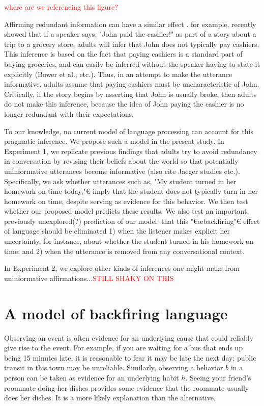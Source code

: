 \documentclass[10pt,letterpaper]{article}
\newcommand{\red}[1]{\textcolor{Red}{#1}}
\begin{document}
\red{where are we referencing this figure?}

Affirming redundant information can have a similar effect \cite{Gruenfeld1992, Kravtchenko2015}.  
 for example, recently showed that if a speaker says, "John paid the cashier!" as part of a story about a trip to a grocery store, adults will infer that John does not typically pay cashiers.  This inference is based on the fact that paying cashiers is a standard part of buying groceries, and can easily be inferred without the speaker having to state it explicitly (Bower et al., etc.).  Thus, in an attempt to make the utterance informative, adults assume that paying cashiers must be uncharacteristic of John.  Critically, if the story begins by asserting that John is usually broke, then adults do not make this inference, because the idea of John paying the cashier is no longer redundant with their expectations.

To our knowledge, no current model of language processing can account for this pragmatic inference.  We propose such a model in the present study.  In Experiment 1, we replicate previous findings that adults try to avoid redundancy in conversation by revising their beliefs about the world so that potentially uninformative utterances become informative \cite{Kravtchenko2015} (also cite Jaeger studies etc.).  Specifically, we ask whether utterances such as, "My student turned in her homework on time today,"€ imply that the student does not typically turn in her homework on time, despite serving as evidence for this behavior.  We then test whether our proposed model predicts these results.  We also test an important, previously unexplored(?) prediction of our model: that this "€œbackfiring"€ effect of language should be eliminated 1) when the listener makes explicit her uncertainty, for instance, about whether the student turned in his homework on time; and 2) when the utterance is removed from any conversational context.


In Experiment 2, we explore other kinds of inferences one might make from uninformative affirmations...\red{STILL SHAKY ON THIS}



\section{A model of backfiring language}

Observing an event is often evidence for an underlying cause that could reliably give rise to the event.
For example, if you are waiting for a bus that ends up being 15 minutes late, it is reasonable to fear it may be late the next day; public transit in this town may be unreliable. 
Similarly, observing a behavior $b$ in a person can be taken as evidence for an underlying habit $h$. 
Seeing your friend's roommate doing her dishes provides some evidence that the roommate usually does her dishes. 
It is a more likely explanation than the alternative.
\end{document}
